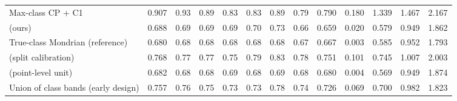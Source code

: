 \begin{table}[!htbp]
{\begin{tabular}{lcccccccccccc}
Max-class CP + C1 & 0.907 & 0.93 & 0.89 & 0.83 & 0.83 & 0.89 & 0.79 & 0.790 & 0.180 & 1.339 & 1.467 & 2.167 \\
\gamut{} (ours) & 0.688 & 0.69 & 0.69 & 0.69 & 0.70 & 0.73 & 0.66 & 0.659 & 0.020 & 0.579 & 0.949 & 1.862 \\
True-class Mondrian (reference) & 0.680 & 0.68 & 0.68 & 0.68 & 0.68 & 0.68 & 0.67 & 0.667 & 0.003 & 0.585 & 0.952 & 1.793 \\
\gamut{} (split calibration) & 0.768 & 0.77 & 0.77 & 0.75 & 0.79 & 0.83 & 0.78 & 0.751 & 0.101 & 0.745 & 1.007 & 2.003 \\
\gamut{} (point-level unit) & 0.682 & 0.68 & 0.68 & 0.69 & 0.68 & 0.69 & 0.68 & 0.680 & 0.004 & 0.569 & 0.949 & 1.874 \\
Union of class bands (early design) & 0.757 & 0.76 & 0.75 & 0.73 & 0.73 & 0.78 & 0.74 & 0.726 & 0.069 & 0.700 & 0.982 & 1.823 \\
\bottomrule
\end{tabular}}
\end{table}

